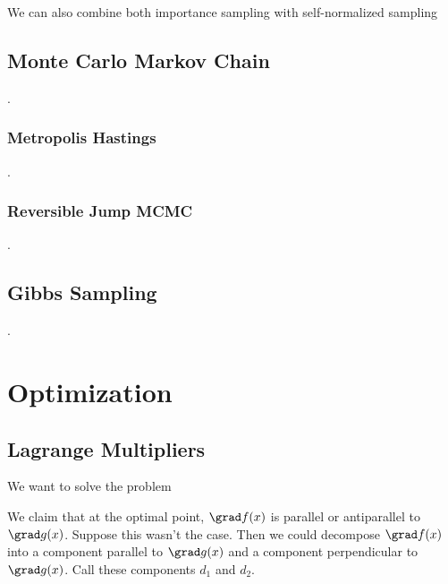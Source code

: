 \documentclass[12pt]{article}
\begin{document}
We can also combine both importance sampling with self-normalized sampling

\iffalse
\todo{check this section}

\eq{
  E_{x \sim p(x)}[f(x)] &= \int p(x) f(x) dx \\
  &= \int q(x) \frac{f(x)p(x)}{q(x)} dx \\  
  &= \int q(x) \frac{f(x) Z_p^{-1} \tilde p(x)}{Z_q^{-1} \tilde q(x)} dx \\
  &= \frac{Z_q}{Z_p} \int q(x) \frac{f(x) \tilde p(x)}{\tilde q(x)} dx \\
  &= \frac{Z_q}{Z_p} E_q \sparen{\frac{f(x) \tilde p(x)}{\tilde q(x)}} \\
  &= E_q \sparen{\frac{\tilde q(x)}{\tilde p(x)}} E_q \sparen{\frac{f(x) \tilde p(x)}{\tilde q(x)}} \\
}

Notice that this only requires the ability to compute the ratio of $p$ and $q$ up to some constant factor.
\fi

\subsection{Monte Carlo Markov Chain}
.
\subsubsection{Metropolis Hastings}
.
\subsubsection{Reversible Jump MCMC}
.
\subsection{Gibbs Sampling}
.
\section{Optimization}

\subsection{Lagrange Multipliers}

We want to solve the problem


We claim that at the optimal point, $\grad f(x)$ is parallel or antiparallel to $\grad g(x)$. Suppose this wasn't the case. Then we could decompose $\grad f(x)$ into a component parallel to $\grad g(x)$ and a component perpendicular to $\grad g(x)$. Call these components $d_1$ and $d_2$. 
\end{document}
